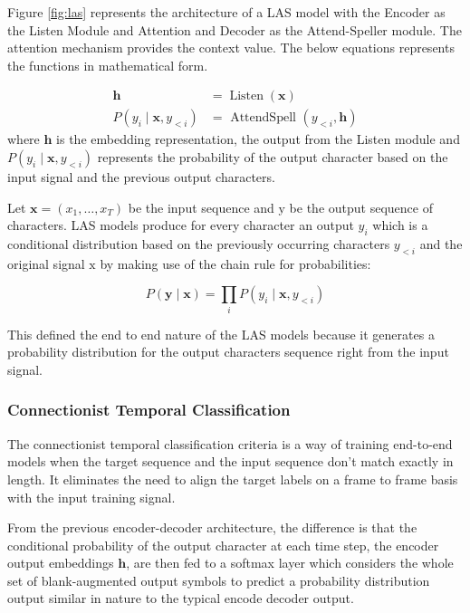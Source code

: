Figure \ref{fig:las} represents the architecture of a LAS model with the Encoder as the Listen Module and Attention and Decoder as the Attend-Speller module. The attention mechanism provides the context value. The below equations represents the functions in mathematical form.

$$
\begin{aligned}
\mathbf{h} &=\operatorname{Listen}(\mathbf{x}) \\
P\left(y_{i} \mid \mathbf{x}, y_{<i}\right) &=\text { AttendSpell }\left(y_{<i}, \mathbf{h}\right)
\end{aligned}
$$
where $ \mathbf{h}$ is the embedding representation, the output from the Listen module and $P\left(y_{i} \mid \mathbf{x}, y_{<i}\right)$ represents the probability of the output character based on the input signal and the previous output characters.

Let $\mathbf{x}=\left(x_{1}, \ldots, x_{T}\right)$ be the input sequence and $\mathrm{y}$ be the output sequence of characters. LAS models produce for every character an output $y_{i}$ which is a conditional distribution based on the previously occurring characters $y_{<i}$ and the original signal $\mathrm{x}$ by making use of the chain rule for probabilities:

$$
P(\mathbf{y} \mid \mathbf{x})=\prod_{i} P\left(y_{i} \mid \mathbf{x}, y_{<i}\right)
$$

This defined the end to end nature of the LAS models because it generates a probability distribution for the output characters sequence right from the input signal. 

\subsubsection{Connectionist Temporal Classification}
The connectionist temporal classification criteria is a way of training end-to-end models when the target sequence and the input sequence don't match exactly in length. It eliminates the need to align the target labels on a frame to frame basis with the input training signal. 

From the previous encoder-decoder architecture, the difference is that the conditional probability of the output character at each time step, the encoder output embeddings $\mathbf{h}$, are then fed to a softmax layer which considers the whole set of blank-augmented output symbols to predict a probability distribution output similar in nature to the typical encode decoder output.


